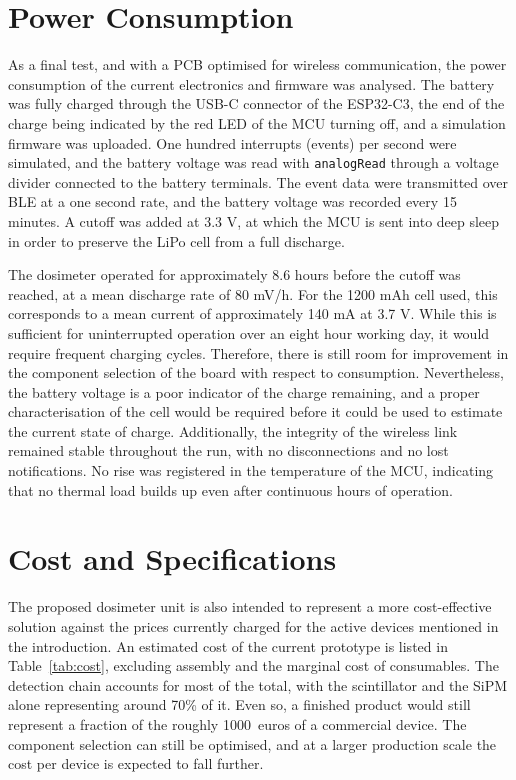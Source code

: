 \section{Power Consumption}
\label{sec:power_consumption}
As a final test, and with a PCB optimised for wireless communication, the power consumption of the current electronics and firmware was analysed. The battery was fully charged through the USB-C connector of the ESP32-C3, the end of the charge being indicated by the red LED of the MCU turning off, and a simulation firmware was
uploaded. One hundred interrupts (events) per second were simulated, and the battery voltage was read with \texttt{analogRead} through a voltage divider connected to the battery terminals. The event data were transmitted over BLE at a one second rate, and the battery voltage was recorded every 15 minutes. A cutoff was added at 3.3 V, at which the MCU is sent into deep sleep in order to preserve the LiPo cell from a full discharge. 

The dosimeter operated for approximately 8.6 hours before the cutoff was reached, at a mean discharge rate of 80 mV/h. For the 1200 mAh cell used, this corresponds to a mean current of approximately 140 mA at 3.7 V. While this is sufficient for uninterrupted operation over an eight hour working day, it would require frequent charging cycles. Therefore, there is still room for improvement in the component selection of the board with respect to consumption. Nevertheless, the battery voltage is a poor indicator of the charge remaining, and a proper characterisation of the cell would be required before it could be used to estimate the current state of charge.
Additionally, the integrity of the wireless link remained stable throughout the run, with no disconnections and no lost notifications. No rise was registered in the temperature of the MCU, indicating that no thermal load builds up even after continuous hours of operation.

\section{Cost and Specifications}
\label{sec:cost_specifications}

The proposed dosimeter unit is also intended to represent a more cost-effective solution against the prices currently charged for the active devices mentioned in the introduction. An estimated cost of the current prototype is listed in Table~\ref{tab:cost}, excluding assembly and the marginal cost of consumables. The detection chain accounts for most of the total, with the scintillator and the SiPM alone representing around 70\% of it. Even so, a finished product would still represent a fraction of the roughly 1000~euros of a commercial device. The component selection can still be optimised, and at a larger production scale the cost per device is expected to fall further.

